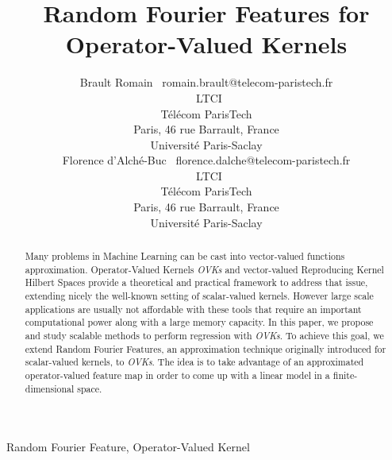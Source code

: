 \documentclass[twoside,11pt]{article}
\begin{document}
\title{Random Fourier Features for Operator-Valued Kernels}

\author{\name{}Brault Romain
       \email~romain.brault@telecom-paristech.fr \\
       \addr~LTCI\\
       T\'el\'ecom ParisTech\\
       Paris, 46 rue Barrault, France \\
       Universit\'e Paris-Saclay \\
       \AND%
       \name{}Florence d'Alch\'e-Buc
       \email~florence.dalche@telecom-paristech.fr \\
       \addr~LTCI\\
       T\'el\'ecom ParisTech\\
       Paris, 46 rue Barrault, France \\
       Universit\'e Paris-Saclay}


\maketitle

\begin{abstract}%
    Many problems in Machine Learning can be cast into
    vector-valued functions approximation. Operator-Valued Kernels
    \emph{\acl{OVK}s} and vector-valued Reproducing Kernel Hilbert Spaces
    provide a theoretical and practical framework to address that issue,
    extending nicely the well-known setting of scalar-valued kernels.
    However large scale applications are usually not affordable with these
    tools that require an important computational power along with a large
    memory capacity. In this paper, we propose and study scalable methods
    to perform regression with \emph{\acl{OVK}s}. To achieve this goal, we
    extend Random Fourier Features, an approximation technique originally
    introduced for scalar-valued kernels, to \emph{\acl{OVK}s}. The idea is
    to take advantage of an approximated operator-valued feature map in
    order to come up with a linear model in a finite-dimensional space.
\end{abstract}

\begin{keywords}
    Random Fourier Feature, Operator-Valued Kernel
\end{keywords}

\end{document}
